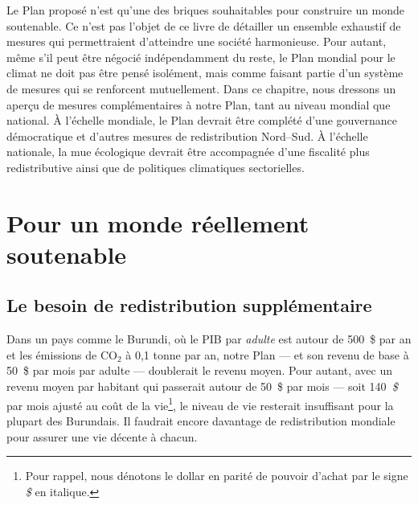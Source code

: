 \documentclass[a5paper,french,openany]{memoir}
\begin{document}
Le Plan proposé n'est qu'une des briques souhaitables pour construire un monde soutenable. Ce n'est pas l'objet de ce livre %
de détailler un ensemble exhaustif de mesures qui permettraient d'atteindre une société harmonieuse. Pour autant, même s'il peut être négocié indépendamment du reste, le Plan mondial pour le climat ne doit pas être pensé isolément, mais comme faisant partie d'un système de mesures qui se renforcent mutuellement. Dans ce chapitre, nous dressons un aperçu de mesures complémentaires à notre Plan, tant au niveau mondial que national. À l'échelle mondiale, le Plan devrait être complété d'une gouvernance démocratique et d'autres mesures de redistribution Nord--Sud. À l'échelle nationale, la mue écologique devrait être accompagnée d'une fiscalité plus redistributive ainsi que de politiques climatiques sectorielles. 

\section{Pour un monde réellement soutenable}

\subsection{Le besoin de redistribution supplémentaire}
Dans un pays comme le Burundi, où le PIB par \textit{adulte} est autour de 500~\$ par an et les émissions de CO$_\text{2}$ à 0,1 tonne par an, notre Plan --- et son revenu de base à 50~\$ par mois par adulte --- doublerait le revenu moyen. 
Pour autant, avec un revenu moyen par habitant qui passerait autour de 50~\$ par mois --- soit 140~\textit{\$} par mois ajusté au coût de la vie\footnote{Pour rappel, nous dénotons le dollar en parité de pouvoir d'achat par le signe \textit{\$} en italique.}, 
le niveau de vie resterait insuffisant pour la plupart des Burundais. Il faudrait encore davantage de redistribution mondiale pour assurer une vie décente à chacun. 
\end{document}
